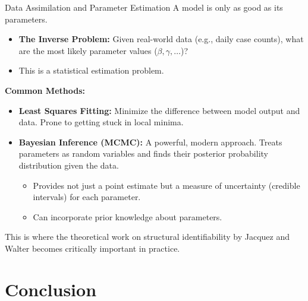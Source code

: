 \documentclass[aspectratio=169]{beamer}\usepackage[]{graphicx}\usepackage[]{xcolor}
\begin{document}
\begin{frame}{Data Assimilation and Parameter Estimation}
    A model is only as good as its parameters.
    \begin{itemize}
        \item \textbf{The Inverse Problem:} Given real-world data (e.g., daily case counts), what are the most likely parameter values ($\beta, \gamma, \dots$)?
        \item This is a statistical estimation problem.
    \end{itemize}
    \vfill
    \textbf{Common Methods:}
    \begin{itemize}
        \item \textbf{Least Squares Fitting:} Minimize the difference between model output and data. Prone to getting stuck in local minima.
        \item \textbf{Bayesian Inference (MCMC):} A powerful, modern approach. Treats parameters as random variables and finds their posterior probability distribution given the data.
        \begin{itemize}
            \item Provides not just a point estimate but a measure of uncertainty (credible intervals) for each parameter.
            \item Can incorporate prior knowledge about parameters.
        \end{itemize}
    \end{itemize}
    This is where the theoretical work on structural identifiability by Jacquez and Walter becomes critically important in practice.
\end{frame}

\section{Conclusion}
\end{document}
